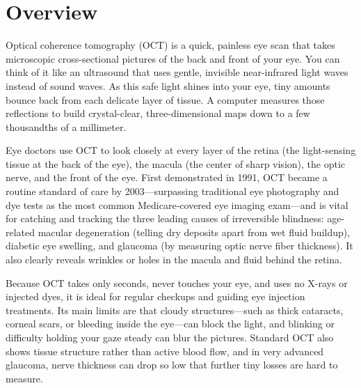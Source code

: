\label{ch:infographic-oct}

\section{Overview}

Optical coherence tomography (OCT) is a quick, painless eye scan that takes microscopic cross-sectional pictures of the back and front of your eye. You can think of it like an ultrasound that uses gentle, invisible near-infrared light waves instead of sound waves. As this safe light shines into your eye, tiny amounts bounce back from each delicate layer of tissue. A computer measures those reflections to build crystal-clear, three-dimensional maps down to a few thousandths of a millimeter.

Eye doctors use OCT to look closely at every layer of the retina (the light-sensing tissue at the back of the eye), the macula (the center of sharp vision), the optic nerve, and the front of the eye. First demonstrated in 1991, OCT became a routine standard of care by 2003---surpassing traditional eye photography and dye tests as the most common Medicare-covered eye imaging exam---and is vital for catching and tracking the three leading causes of irreversible blindness: age-related macular degeneration (telling dry deposits apart from wet fluid buildup), diabetic eye swelling, and glaucoma (by measuring optic nerve fiber thickness). It also clearly reveals wrinkles or holes in the macula and fluid behind the retina.

Because OCT takes only seconds, never touches your eye, and uses no X-rays or injected dyes, it is ideal for regular checkups and guiding eye injection treatments. Its main limits are that cloudy structures---such as thick cataracts, corneal scars, or bleeding inside the eye---can block the light, and blinking or difficulty holding your gaze steady can blur the pictures. Standard OCT also shows tissue structure rather than active blood flow, and in very advanced glaucoma, nerve thickness can drop so low that further tiny losses are hard to measure.

